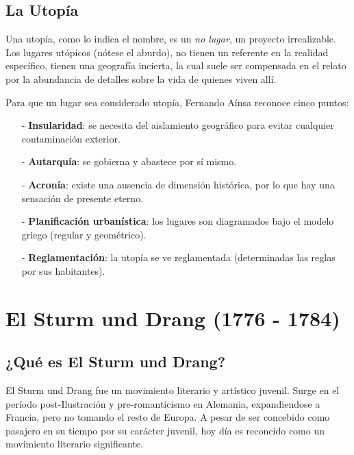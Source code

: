 \documentclass{article}
\begin{document}
\subsection{La Utopía}

Una utopía, como lo indica el nombre, es un \textit{no lugar}, un proyecto irrealizable. Los lugares utópicos (nótese el aburdo), no tienen un referente en la realidad específico, tienen una geografía incierta, la cual suele ser compensada en el relato por la abundancia de detalles sobre la vida de  quienes viven allí.

Para que un lugar sea considerado utopía, Fernando Aínsa reconoce cinco puntos:

\begin{itemize}
    \item[-] \textbf{Insularidad}: se necesita del aislamiento geográfico para evitar cualquier contaminación exterior.
    \item[-] \textbf{Autarquía}: se gobierna y abastece por sí mismo.
    \item[-] \textbf{Acronía}: existe una ausencia de dimensión histórica, por lo que hay una sensación de presente eterno.
    \item[-] \textbf{Planificación urbanística}: los lugares son diagramados bajo el modelo griego (regular y geométrico).
    \item[-] \textbf{Reglamentación}: la utopía se ve reglamentada (determinadas las reglas por sus habitantes).
\end{itemize}

\section{El Sturm und Drang (1776 - 1784)}

\subsection{¿Qué es El Sturm und Drang?}

El Sturm und Drang fue un movimiento literario y artístico juvenil. Surge en el período post-Ilustración y pre-romanticismo en Alemania, expandiendose a Francia, pero no tomando el resto de Europa. A pesar de ser concebido como pasajero en su tiempo por su carácter juvenil, hoy día es reconcido como un movimiento literario significante.
\end{document}
